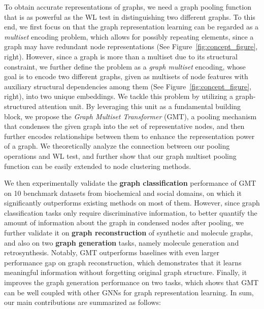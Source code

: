 \documentclass{article} \usepackage{iclr2021_conference,times}
\begin{document}
To obtain accurate representations of graphs, we need a graph pooling function that is as powerful as the WL test in distinguishing two different graphs. To this end, we first focus on that the graph representation learning can be regarded as a \emph{multiset} encoding problem, which allows for possibly repeating elements, since a graph may have redundant node representations (See Figure~\ref{fig:concept_figure}, right). However, since a graph is more than a multiset due to its structural constraint, we further define the problem as a \emph{graph multiset} encoding, whose goal is to encode two different graphs, given as multisets of node features with auxiliary structural dependencies among them (See Figure~\ref{fig:concept_figure}, right), into two unique embeddings. We tackle this problem by utilizing a graph-structured attention unit. By leveraging this unit as a fundamental building block, we propose the \emph{Graph Multiset Transformer} (GMT), a pooling mechanism that condenses the given graph into the set of representative nodes, and then further encodes relationships between them to enhance the representation power of a graph. We theoretically analyze the connection between our pooling operations and WL test, and further show that our graph multiset pooling function can be easily extended to node clustering methods.

We then experimentally validate the \textbf{graph classification} performance of GMT on 10 benchmark datasets from biochemical and social domains, on which it significantly outperforms existing methods on most of them. However, since graph classification tasks only require discriminative information, to better quantify the amount of information about the graph in condensed nodes after pooling, we further validate it on  \textbf{graph reconstruction} of synthetic and molecule graphs, and also on two \textbf{graph generation} tasks, namely molecule generation and retrosynthesis. Notably, GMT outperforms baselines with even larger performance gap on graph reconstruction, which demonstrates that it learns meaningful information without forgetting original graph structure. Finally, it improves the graph generation performance on two tasks, which shows that GMT can be well coupled with other GNNs for graph representation learning. In sum, our main contributions are summarized as follows:
\end{document}

